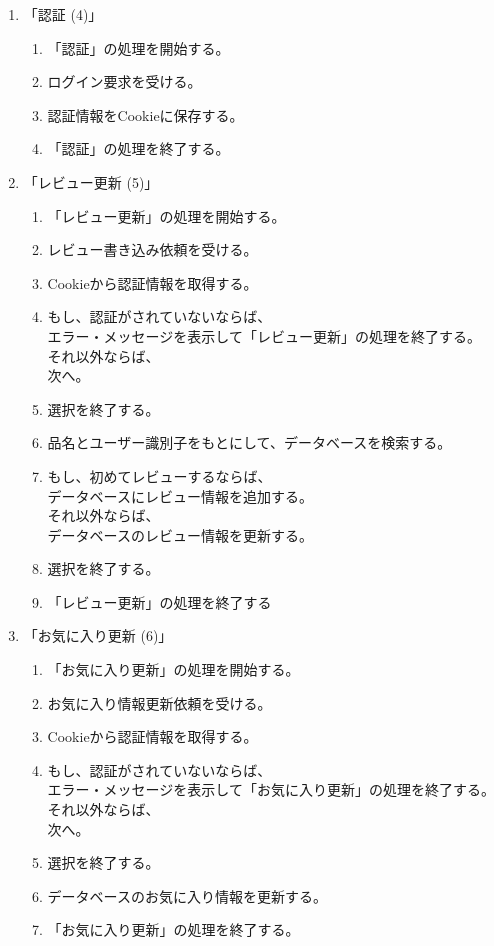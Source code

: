 \documentclass[a4paper]{jsarticle}
\begin{document}
\begin{enumerate}
\item 「認証 (4)」
  \begin{enumerate}
    \item 「認証」の処理を開始する。
    \item ログイン要求を受ける。
    \item 認証情報をCookieに保存する。
    \item 「認証」の処理を終了する。
  \end{enumerate}
\item 「レビュー更新 (5)」
  \begin{enumerate}
    \item 「レビュー更新」の処理を開始する。
    \item レビュー書き込み依頼を受ける。
    \item Cookieから認証情報を取得する。
    \item もし、認証がされていないならば、\\
          \hspace{0.5cm} エラー・メッセージを表示して「レビュー更新」の処理を終了する。\\
          それ以外ならば、\\
          \hspace{0.5cm} 次へ。
    \item 選択を終了する。
    \item 品名とユーザー識別子をもとにして、データベースを検索する。
    \item もし、初めてレビューするならば、\\
          \hspace{0.5cm} データベースにレビュー情報を追加する。\\
          それ以外ならば、\\
          \hspace{0.5cm} データベースのレビュー情報を更新する。
    \item 選択を終了する。
    \item 「レビュー更新」の処理を終了する
  \end{enumerate}
\item 「お気に入り更新 (6)」
  \begin{enumerate}
    \item 「お気に入り更新」の処理を開始する。
    \item お気に入り情報更新依頼を受ける。
    \item Cookieから認証情報を取得する。
    \item もし、認証がされていないならば、\\
          \hspace{0.5cm} エラー・メッセージを表示して「お気に入り更新」の処理を終了する。\\
          それ以外ならば、\\
          \hspace{0.5cm} 次へ。
    \item 選択を終了する。
    \item データベースのお気に入り情報を更新する。
    \item 「お気に入り更新」の処理を終了する。
  \end{enumerate}


\end{enumerate}
\end{document}
